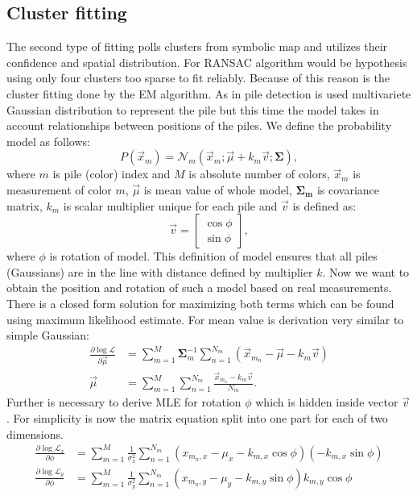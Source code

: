 \subsection{Cluster fitting}
The second type of fitting polls clusters from symbolic map and utilizes their confidence and spatial distribution. For RANSAC algorithm would be hypothesis using only four clusters too sparse to fit reliably. Because of this reason is the cluster fitting done by the EM algorithm. As in pile detection is used multivariete Gaussian distribution to represent the pile but this time the model takes in account relationships between positions of the piles. We define the probability model as follows:
\begin{equation}
P(\vec{x}_m) = \mathcal{N}_m(\vec{x}_m; \vec{\mu} + k_m\vec{v}; \bm{\Sigma}),
\end{equation}
where $m$ is pile (color) index and $M$ is absolute number of colors, $\vec{x}_m$ is measurement of color $m$, $\vec{\mu}$ is mean value of whole model, $\bm{\Sigma_m}$ is covariance matrix, $k_m$ is scalar multiplier unique for each pile and $\vec{v}$ is defined as:
\begin{equation}
\vec{v} = \begin{bmatrix}
\cos \phi \\
\sin \phi
\end{bmatrix},
\end{equation}
where $\phi$ is rotation of model. This definition of model ensures that all piles (Gaussians) are in the line with distance defined by multiplier $k$. Now we want to obtain the position and rotation of such a model based on real measurements. There is a closed form solution for maximizing both terms which can be found using maximum likelihood estimate. For mean value is derivation very similar to simple Gaussian:
\begin{align}
\frac{\partial \log\mathcal{L} }{\partial \vec{\mu}} &= \sum_{m=1}^M \bm{\Sigma}^{-1}_m \sum_{n = 1}^{N_m} (\vec{x}_{m_n} - \vec{\mu} - k_m \vec{v}) \\
\vec{\mu} &= \sum_{m=1}^M \sum_{n = 1}^{N_m} \frac{\vec{x}_{m_n} - k_m \vec{v}}{N_m}.
\end{align}
Further is necessary to derive MLE for rotation $\phi$ which is hidden inside vector $\vec{v}$. For simplicity is now the matrix equation split into one part for each of two dimensions.  
\begin{align}
\frac{\partial \log\mathcal{L}_x }{\partial \phi} &= \sum_{m=1}^{M} \frac{1}{\sigma^2_x} \sum_{n=1}^{N_m} (x_{m_n, x} - \mu_x - k_{m, x} \cos \phi) \left( -k_{m,x} \sin \phi\right)  \\
\frac{\partial \log\mathcal{L}_y }{\partial \phi} &= \sum_{m=1}^{M} \frac{1}{\sigma^2_y} \sum_{n=1}^{N_m} (x_{m_n, y} - \mu_y - k_{m, y} \sin \phi) k_{m,y} \cos \phi
\end{align}

